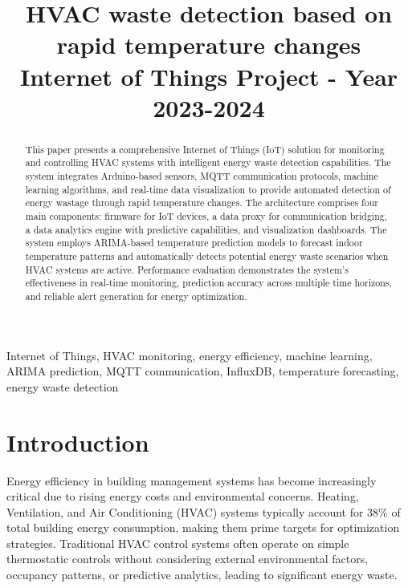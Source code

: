 \documentclass[journal]{IEEEtran}
\begin{document}
\title{HVAC waste detection based on rapid temperature changes\\
{\footnotesize Internet of Things Project - Year 2023-2024}}

\author{
}

\maketitle

\begin{abstract}
This paper presents a comprehensive Internet of Things (IoT) solution for monitoring and controlling HVAC systems with intelligent energy waste detection capabilities. The system integrates Arduino-based sensors, MQTT communication protocols, machine learning algorithms, and real-time data visualization to provide automated detection of energy wastage through rapid temperature changes. The architecture comprises four main components: firmware for IoT devices, a data proxy for communication bridging, a data analytics engine with predictive capabilities, and visualization dashboards. The system employs ARIMA-based temperature prediction models to forecast indoor temperature patterns and automatically detects potential energy waste scenarios when HVAC systems are active. Performance evaluation demonstrates the system's effectiveness in real-time monitoring, prediction accuracy across multiple time horizons, and reliable alert generation for energy optimization.
\end{abstract}

\begin{IEEEkeywords}
Internet of Things, HVAC monitoring, energy efficiency, machine learning, ARIMA prediction, MQTT communication, InfluxDB, temperature forecasting, energy waste detection
\end{IEEEkeywords}

\section{Introduction}

Energy efficiency in building management systems has become increasingly critical due to rising energy costs and environmental concerns. Heating, Ventilation, and Air Conditioning (HVAC) systems typically account for 38\% of total building energy consumption, making them prime targets for optimization strategies\cite{GONZALEZTORRES2022626}. Traditional HVAC control systems often operate on simple thermostatic controls without considering external environmental factors, occupancy patterns, or predictive analytics, leading to significant energy waste.
\end{document}
